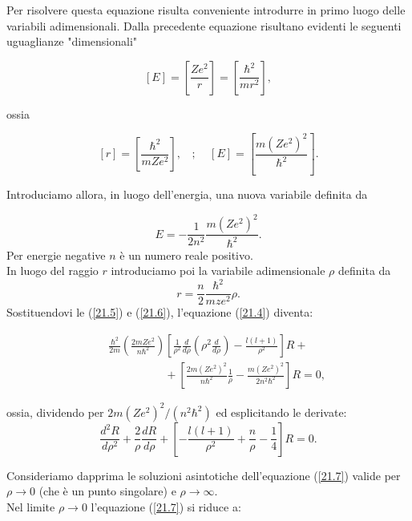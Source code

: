 Per risolvere questa equazione risulta conveniente introdurre in primo luogo delle variabili adimensionali. Dalla precedente equazione risultano evidenti le seguenti uguaglianze "dimensionali"

\begin{equation}
\left[E\right]=\left[\frac{Ze^2}{r}\right]=\left[\frac{\hbar^2}{mr^2}\right] ,
\end{equation}

ossia

\begin{equation}
\left[r\right]=\left[\frac{\hbar^2}{mZe^2}\right] , \ \ \ \ ;\ \ \ \ \ \left[E\right]=\left[\frac{m\left(Ze^2\right)^2}{\hbar^2}\right] .
\end{equation}

Introduciamo allora, in luogo dell'energia, una nuova variabile definita da

\begin{equation}
E=-\frac{1}{2n^2}\frac{m\left(Ze^2\right)^2}{\hbar^2} .
\label{21.5}
\end{equation}
Per energie negative $n$ è un numero reale positivo.\\
In luogo del raggio $r$ introduciamo poi la variabile adimensionale $\rho$ definita da 
\begin{equation}
r=\frac{n}{2}\frac{\hbar^2}{mze^2}\rho .
\label{21.6}
\end{equation}
Sostituendovi le (\ref{21.5}) e (\ref{21.6}), l'equazione (\ref{21.4}) diventa:

\begin{eqnarray}
& & \frac{\hbar^2}{2m}\left(\frac{2mZe^2}{n\hbar^2}\right)\left[\frac{1}{\rho^2}\frac{d}{d\rho}\left(\rho^2\frac{d}{d\rho}\right)-\frac{l\left(l+1\right)}{\rho^2}\right]R +\nonumber \\
& & \qquad \qquad \quad +\left[\frac{2m\left(Ze^2\right)^2}{n\hbar^2}\frac{1}{\rho}-\frac{m\left(Ze^2\right)^2}{2n^2\hbar^2}\right]R=0 ,
\end{eqnarray}

ossia, dividendo per $2m\left(Ze^2\right)^2/\left(n^2\hbar^2\right)$ ed esplicitando le derivate:
\begin{equation}
\frac{d^2R}{d\rho^2}+\frac{2}{\rho}\frac{dR}{d\rho}+\left[-\frac{l\left(l+1\right)}{\rho^2}+\frac{n}{\rho}-\frac{1}{4}\right]R=0 .
\label{21.7}
\end{equation}

Consideriamo dapprima le soluzioni asintotiche dell'equazione (\ref{21.7}) valide per $\rho\rightarrow0$ (che è un punto singolare) e $\rho\rightarrow\infty$.\\
Nel limite $\rho\rightarrow0$ l'equazione (\ref{21.7}) si riduce a:

